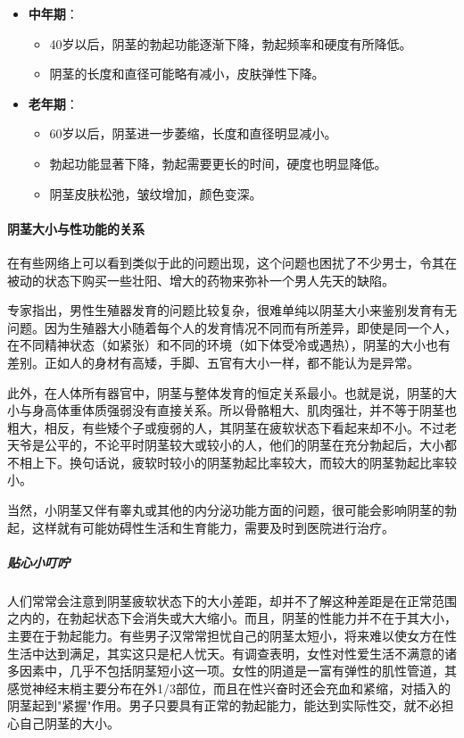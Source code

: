 \begin{itemize}
\begin{itemize}
  \item 阴茎大小和形态达到成人水平，能够完成勃起、性交和射精等功能。
  \item 阴茎的勃起频率和硬度处于最佳状态。
  \end{itemize}
\item \textbf{中年期}：
  \begin{itemize}
  \item 40岁以后，阴茎的勃起功能逐渐下降，勃起频率和硬度有所降低。
  \item 阴茎的长度和直径可能略有减小，皮肤弹性下降。
  \end{itemize}
\item \textbf{老年期}：
  \begin{itemize}
  \item 60岁以后，阴茎进一步萎缩，长度和直径明显减小。
  \item 勃起功能显著下降，勃起需要更长的时间，硬度也明显降低。
  \item 阴茎皮肤松弛，皱纹增加，颜色变深。
  \end{itemize}
\end{itemize}

\paragraph{阴茎大小与性功能的关系}

在有些网络上可以看到类似于此的问题出现，这个问题也困扰了不少男士，令其在被动的状态下购买一些壮阳、增大的药物来弥补一个男人先天的缺陷。

专家指出，男性生殖器发育的问题比较复杂，很难单纯以阴茎大小来鉴别发育有无问题。因为生殖器大小随着每个人的发育情况不同而有所差异，即使是同一个人，在不同精神状态（如紧张）和不同的环境（如下体受冷或遇热），阴茎的大小也有差别。正如人的身材有高矮，手脚、五官有大小一样，都不能认为是异常。

此外，在人体所有器官中，阴茎与整体发育的恒定关系最小。也就是说，阴茎的大小与身高体重体质强弱没有直接关系。所以骨骼粗大、肌肉强壮，并不等于阴茎也粗大，相反，有些矮个子或瘦弱的人，其阴茎在疲软状态下看起来却不小。不过老天爷是公平的，不论平时阴茎较大或较小的人，他们的阴茎在充分勃起后，大小都不相上下。换句话说，疲软时较小的阴茎勃起比率较大，而较大的阴茎勃起比率较小。

当然，小阴茎又伴有睾丸或其他的内分泌功能方面的问题，很可能会影响阴茎的勃起，这样就有可能妨碍性生活和生育能力，需要及时到医院进行治疗。

\subparagraph{贴心小叮咛}

人们常常会注意到阴茎疲软状态下的大小差距，却并不了解这种差距是在正常范围之内的，在勃起状态下会消失或大大缩小。而且，阴茎的性能力并不在于其大小，主要在于勃起能力。有些男子汉常常担忧自己的阴茎太短小，将来难以使女方在性生活中达到满足，其实这只是杞人忧天。有调查表明，女性对性爱生活不满意的诸多因素中，几乎不包括阴茎短小这一项。女性的阴道是一富有弹性的肌性管道，其感觉神经末梢主要分布在外1/3部位，而且在性兴奋时还会充血和紧缩，对插入的阴茎起到"紧握"作用。男子只要具有正常的勃起能力，能达到实际性交，就不必担心自己阴茎的大小。


